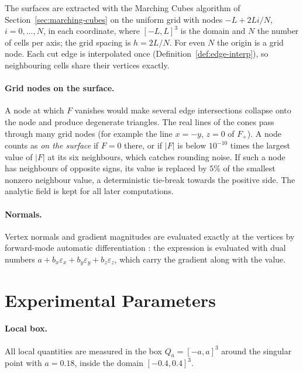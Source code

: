 The surfaces are extracted with the Marching Cubes algorithm of
Section~\ref{sec:marching-cubes} \cite{lorensen1998marching} on the uniform grid with nodes
$-L+2Li/N$, $i=0,\dots,N$, in each coordinate, where $[-L,L]^3$ is the domain
and $N$ the number of cells per axis; the grid spacing is $h=2L/N$. For even
$N$ the origin is a grid node. Each cut edge is interpolated once
(Definition~\ref{def:edge-interp}), so neighbouring cells share their vertices
exactly.

\paragraph{Grid nodes on the surface.}
A node at which $F$ vanishes would make several edge intersections collapse
onto the node and produce degenerate triangles. The real lines of the cones
pass through many grid nodes (for example the line $x=-y$, $z=0$ of $F_+$). A
node counts as \emph{on the surface} if $F=0$ there, or if $|F|$ is below
$10^{-10}$ times the largest value of $|F|$ at its six neighbours, which
catches rounding noise. If such a node has neighbours of opposite signs, its
value is replaced by $5\%$ of the smallest nonzero neighbour value, a
deterministic tie-break towards the positive side. The analytic field is kept
for all later computations.

\paragraph{Normals.}
Vertex normals and gradient magnitudes are evaluated exactly at the vertices
by forward-mode automatic differentiation \cite{griewank2008evaluating}: the
expression is evaluated with dual numbers $a+b_x\varepsilon_x+b_y\varepsilon_y+b_z\varepsilon_z$,
which carry the gradient along with the value.

\section{Experimental Parameters}
\label{sec:method-parameters}

\paragraph{Local box.} All local quantities are measured in the box
$Q_a=[-a,a]^3$ around the singular point with $a=0.18$, inside the domain
$[-0.4,0.4]^3$.

